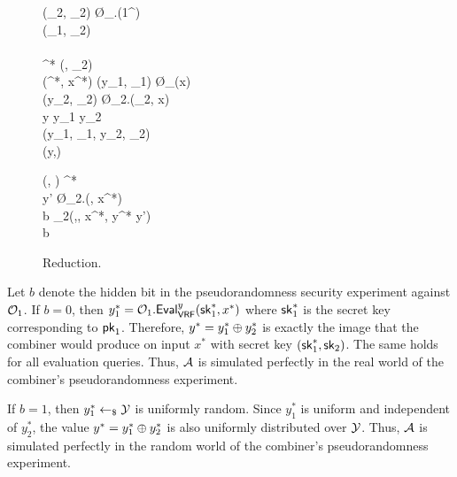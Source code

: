 \begin{figure}[htbp]
	\centering 
	\begin{pcvstack}[center]
	\begin{pchstack}[space=1em]
		{
			(\sk_{2}, \pk_{2}) \sample \O_{}.(1^\lambda)\\
			\pk \gets (\pk_1, \pk_2)\\ 
			\smash{(\sigma, x^*) \sample \A_1^{\BBComb{VRF}[\O_1,\O_2]}(\pk)}\\ 
			\sigma^* \gets (\sigma, \sk_2)\\
			\pcreturn (\sigma^*, x^*)
		}
		{
			(y_1, \pi_1) \gets \O_{}(x)\\ 
			(y_{2}, \pi_{2}) \gets \O_{{2}}.(\sk_{2}, x)\\ 
			y \gets y_1 \xor y_2\\ 
			\pi \gets (y_1, \pi_1, y_2, \pi_2)\\ 
			\pcreturn (y,\pi)
		}
	\end{pchstack}
	\procedure[linenumbering]
	{Reduction $\mathcal B_2(\pk, \sigma^*, x^*, y^*)$}
	{
		(\sigma, \sk) \gets \sigma^*\\
		y' \gets \O_2.(\sk, x^*)\\ 
		b \sample \A_2(\pk,\sigma, x^*, y^* \xor y')\\ 
		\pcreturn b
	}
	\end{pcvstack}
	\caption{Reduction.}
	\label{fig:reduction}
\end{figure}

Let $b$ denote the hidden bit in the pseudorandomness security experiment against $\mathcal{O}_1$.
If $b = 0$, then $y_1^* = \O_1.\alg{Eval}{VRF}^y(\sk_1^*, x^*)$ where $\textup{\textsf{sk}}_1^*$ is the secret key corresponding to $\textup{\textsf{pk}}_1$.
Therefore, $y^* = y_1^* \oplus y_2^*$ is exactly the image that the combiner would produce on input $x^*$ with secret key $(\textup{\textsf{sk}}_1^*, \textup{\textsf{sk}}_2)$.
The same holds for all evaluation queries. Thus, $\mathcal{A}$ is simulated perfectly in the real world of the combiner's pseudorandomness experiment.

If $b = 1$, then $y_1^* \gets_\$ \mathcal{Y}$ is uniformly random. Since $y_1^*$ is uniform and independent of $y_2^*$, the value $y^* = y_1^* \oplus y_2^*$ is also uniformly distributed over $\mathcal{Y}$.
Thus, $\mathcal{A}$ is simulated perfectly in the random world of the combiner's pseudorandomness experiment.

